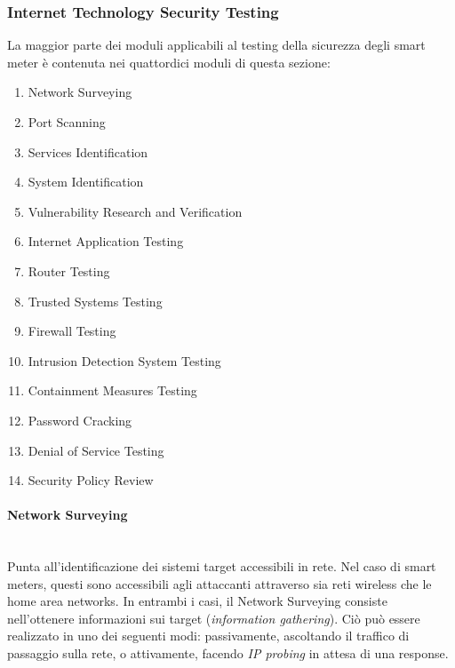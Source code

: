 \subsubsection{Internet Technology Security Testing}
La maggior parte dei moduli applicabili al testing della sicurezza degli smart meter è contenuta nei quattordici moduli di questa sezione:
\begin{enumerate}
	\item Network Surveying
	\item Port Scanning
	\item Services Identification
	\item System Identification
	\item Vulnerability Research and Verification
	\item Internet Application Testing
	\item Router Testing
	\item Trusted Systems Testing
	\item Firewall Testing
	\item Intrusion Detection System Testing
	\item Containment Measures Testing
	\item Password Cracking
	\item Denial of Service Testing
	\item Security Policy Review
\end{enumerate}

\paragraph{Network Surveying}\mbox{}\\
Punta all'identificazione dei sistemi target accessibili in rete. Nel caso di smart meters, questi sono accessibili agli attaccanti attraverso sia reti wireless che le home area networks. In entrambi i casi, il Network Surveying consiste nell'ottenere informazioni sui target (\emph{information gathering}). 
Ciò può essere realizzato in uno dei seguenti modi: passivamente, ascoltando il traffico di passaggio sulla rete, o attivamente, facendo \emph{IP probing} in attesa di una response.\\

